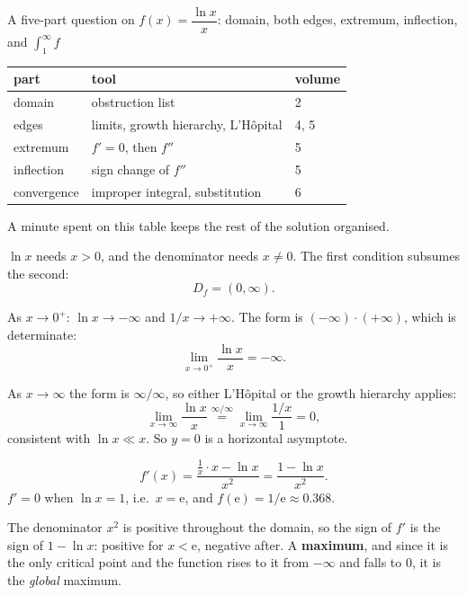 \begin{worked}{A five-part question on $f(x)=\dfrac{\ln x}{x}$: domain, both edges, extremum, inflection, and $\int_{1}^{\infty}f$}
\begin{center}\footnotesize
\begin{tabular}{lll}
  \hline
  part & tool & volume\\
  \hline
  domain & obstruction list & 2\\
  edges & limits, growth hierarchy, L'H\^opital & 4, 5\\
  extremum & $f'=0$, then $f''$ & 5\\
  inflection & sign change of $f''$ & 5\\
  convergence & improper integral, substitution & 6\\
  \hline
\end{tabular}
\end{center}
A minute spent on this table keeps the rest of the solution organised.

$\ln x$ needs $x>0$, and the denominator needs $x\neq0$. The first
condition subsumes the second:
\[
  D_{f}=(0,\infty).
\]

As $x\to0^{+}$: $\ln x\to-\infty$ and $1/x\to+\infty$. The form is
$(-\infty)\cdot(+\infty)$, which is determinate:
\[
  \lim_{x\to0^{+}}\frac{\ln x}{x}=-\infty .
\]

As $x\to\infty$ the form is $\infty/\infty$, so either L'H\^opital or the
growth hierarchy applies:
\[
  \lim_{x\to\infty}\frac{\ln x}{x}
  \overset{\infty/\infty}{=}\lim_{x\to\infty}\frac{1/x}{1}=0 ,
\]
consistent with $\ln x\ll x$. So $y=0$ is a horizontal asymptote.

\[
  f'(x)=\frac{\tfrac1x\cdot x-\ln x}{x^{2}}=\frac{1-\ln x}{x^{2}} .
\]
$f'=0$ when $\ln x=1$, i.e.\ $x=\mathrm{e}$, and
$f(\mathrm{e})=1/\mathrm{e}\approx0.368$.

The denominator $x^{2}$ is positive throughout the domain, so the sign of
$f'$ is the sign of $1-\ln x$: positive for $x<\mathrm{e}$, negative
after. A \textbf{maximum}, and since it is the only critical point and the
function rises to it from $-\infty$ and falls to $0$, it is the
\emph{global} maximum.


\end{worked}

